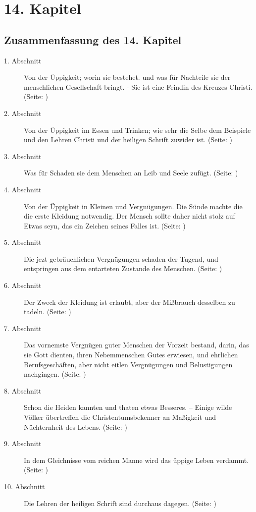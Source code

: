 
\chapter{14. Kapitel} \label{kap14}

\section{Zusammenfassung des 14. Kapitel}
\small
\begin{description}
\item[1. Abschnitt] Von der Üppigkeit; worin sie bestehet. und was für Nachteile
sie der menschlichen Gesellschaft bringt. - Sie ist eine Feindin des Kreuzes
Christi. (Seite: \pageref{kap14_ab1})
\item[2. Abschnitt] Von der Üppigkeit im Essen und Trinken; wie sehr die Selbe
dem Beispiele und den Lehren Christi und der heiligen Schrift zuwider ist. (Seite: \pageref{kap14_ab2})
\item[3. Abschnitt] Was für Schaden sie dem Menschen an Leib und Seele zufügt. (Seite: \pageref{kap14_ab3})
\item[4. Abschnitt] Von der Üppigkeit in Kleinen und Vergnügungen. Die Sünde
machte die die erste Kleidung notwendig. Der Mensch sollte daher nicht stolz auf
Etwas seyn, das ein Zeichen seines Falles ist. (Seite: \pageref{kap14_ab4})
\item[5. Abschnitt] Die jezt gebräuchlichen Vergnügungen schaden der Tugend, und
entspringen aus dem entarteten Zustande des Menschen. (Seite: \pageref{kap14_ab5})
\item[6. Abschnitt] Der Zweck der Kleidung ist erlaubt, aber der Mißbrauch
desselben zu tadeln. (Seite: \pageref{kap14_ab6})
\item[7. Abschnitt] Das vornemste Vergnügen guter Menschen der Vorzeit bestand,
darin, das sie Gott dienten, ihren Nebemmenschen Gutes erwiesen, und ehrlichen
Berufsgeschäften, aber nicht eitlen Vergnügungen und Belustigungen nachgingen. (Seite: \pageref{kap14_ab7})
\item[8. Abschnitt] Schon die Heiden kannten und thaten etwas Besseres. --
Einige wilde Völker übertreffen die Christentumsbekenner an Maßigkeit und
Nüchternheit des Lebens. (Seite: \pageref{kap14_ab8})
\item[9. Abschnitt] In dem Gleichnisse vom reichen Manne wird das üppige Leben
verdammt. (Seite: \pageref{kap14_ab9})
\item[10. Abschnitt] Die Lehren der heiligen Schrift sind durchaus dagegen. (Seite: \pageref{kap14_ab10})
\end{description}
\normalsize

